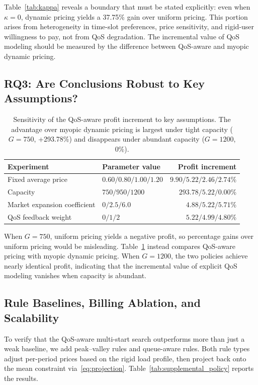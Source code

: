\documentclass[11pt]{article}
\begin{document}
Table~\ref{tab:kappa} reveals a boundary that must be stated explicitly:
even when $\kappa=0$, dynamic pricing yields a 37.75\% gain over uniform
pricing. This portion arises from heterogeneity in time-slot preferences,
price sensitivity, and rigid-user willingness to pay, not from QoS
degradation. The incremental value of QoS modeling should be measured by
the difference between QoS-aware and myopic dynamic pricing.

\subsection{RQ3: Are Conclusions Robust to Key Assumptions?}

\begin{table}[htbp]
\centering
\caption{Sensitivity of the QoS-aware profit increment to key assumptions.
The advantage over myopic dynamic pricing is largest under tight capacity
($G=750$, +293.78\%) and disappears under abundant capacity ($G=1200$, 0\%).}
\label{tab:ablation}
\begin{tabular}{llr}
\toprule
Experiment & Parameter value & Profit increment \\
\midrule
Fixed average price & $0.60 / 0.80 / 1.00 / 1.20$ & $9.90 / 5.22 / 2.46 / 2.74$\% \\
Capacity & $750 / 950 / 1200$ & $293.78 / 5.22 / 0.00$\% \\
Market expansion coefficient & $0 / 2.5 / 6.0$ & $4.88 / 5.22 / 5.71$\% \\
QoS feedback weight & $0 / 1 / 2$ & $5.22 / 4.99 / 4.80$\% \\
\bottomrule
\end{tabular}
\end{table}

When $G=750$, uniform pricing yields a negative profit, so percentage gains
over uniform pricing would be misleading. Table~\ref{tab:ablation} instead
compares QoS-aware pricing with myopic dynamic pricing. When $G=1200$, the
two policies achieve nearly identical profit, indicating that the incremental
value of explicit QoS modeling vanishes when capacity is abundant.

\subsection{Rule Baselines, Billing Ablation, and Scalability}

To verify that the QoS-aware multi-start search outperforms more than just
a weak baseline, we add peak--valley rules and queue-aware rules. Both rule
types adjust per-period prices based on the rigid load profile, then project
back onto the mean constraint via~\eqref{eq:projection}.
Table~\ref{tab:supplemental_policy} reports the results.
\end{document}
